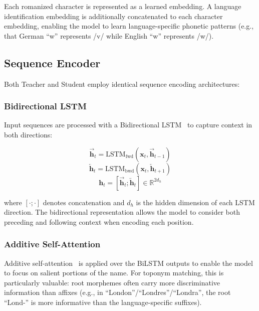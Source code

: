 \documentclass[11pt]{article}
\begin{document}
    Each romanized character is represented as a learned embedding. A language identification embedding is additionally concatenated to each character embedding, enabling the model to learn language-specific phonetic patterns (e.g., that German ``w'' represents /v/ while English ``w'' represents /w/).

    \subsection{Sequence Encoder}

    Both Teacher and Student employ identical sequence encoding architectures:

    \subsubsection{Bidirectional LSTM}

    Input sequences are processed with a Bidirectional LSTM~\citep{schuster1997} to capture context in both directions:

    \begin{equation}
        \overrightarrow{\mathbf{h}}_t = \text{LSTM}_{\text{fwd}}(\mathbf{x}_t, \overrightarrow{\mathbf{h}}_{t-1})
    \end{equation}
    \begin{equation}
        \overleftarrow{\mathbf{h}}_t = \text{LSTM}_{\text{bwd}}(\mathbf{x}_t, \overleftarrow{\mathbf{h}}_{t+1})
    \end{equation}
    \begin{equation}
        \mathbf{h}_t = [\overrightarrow{\mathbf{h}}_t; \overleftarrow{\mathbf{h}}_t] \in \mathbb{R}^{2d_h}
    \end{equation}

    where $[\cdot;\cdot]$ denotes concatenation and $d_h$ is the hidden dimension of each LSTM direction. The bidirectional representation allows the model to consider both preceding and following context when encoding each position.

    \subsubsection{Additive Self-Attention}

    Additive self-attention~\citep{lin2017structured} is applied over the BiLSTM outputs to enable the model to focus on salient portions of the name. For toponym matching, this is particularly valuable: root morphemes often carry more discriminative information than affixes (e.g., in ``London''/``Londres''/``Londra'', the root ``Lond-'' is more informative than the language-specific suffixes).
\end{document}
